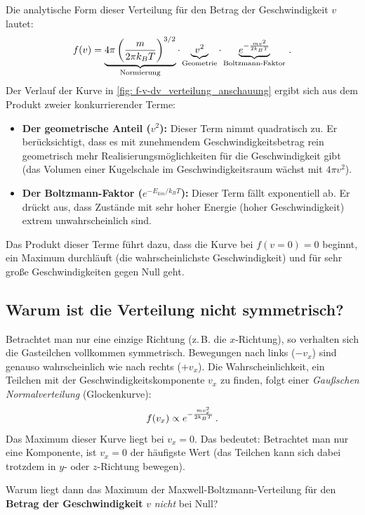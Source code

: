 Die analytische Form dieser Verteilung für den Betrag der Geschwindigkeit $v$ lautet:
\begin{equation}\label{eq:maxwell_boltzmann}
    f(v) = \underbrace{4\pi \left(\frac{m}{2\pi k_B T}\right)^{3/2}}_{\text{Normierung}} \cdot \underbrace{v^2}_{\text{Geometrie}} \cdot \underbrace{e^{-\frac{mv^2}{2k_B T}}}_{\text{Boltzmann-Faktor}} \,.
\end{equation}
Der Verlauf der Kurve in \cref{fig: f-v-dv_verteilung_anschauung} ergibt sich aus dem Produkt zweier konkurrierender Terme:
\begin{itemize}
    \item \textbf{Der geometrische Anteil ($v^2$):} Dieser Term nimmt quadratisch zu. Er berücksichtigt, dass es mit zunehmendem Geschwindigkeitsbetrag rein geometrisch mehr Realisierungsmöglichkeiten für die Geschwindigkeit gibt (das Volumen einer Kugelschale im Geschwindigkeitsraum wächst mit $4\pi v^2$).
    \item \textbf{Der Boltzmann-Faktor ($e^{-E_{kin}/k_B T}$):} Dieser Term fällt exponentiell ab. Er drückt aus, dass Zustände mit sehr hoher Energie (hoher Geschwindigkeit) extrem unwahrscheinlich sind.
\end{itemize}
Das Produkt dieser Terme führt dazu, dass die Kurve bei $f(v=0) = 0$ beginnt, ein Maximum durchläuft (die wahrscheinlichste Geschwindigkeit) und für sehr große Geschwindigkeiten gegen Null geht.
\subsection{Warum ist die Verteilung nicht symmetrisch?}
Betrachtet man nur eine einzige Richtung (z.\,B. die $x$-Richtung), so verhalten sich die Gasteilchen vollkommen symmetrisch. Bewegungen nach links ($-v_x$) sind genauso wahrscheinlich wie nach rechts ($+v_x$). Die Wahrscheinlichkeit, ein Teilchen mit der Geschwindigkeitskomponente $v_x$ zu finden, folgt einer \textit{Gaußschen Normalverteilung} (Glockenkurve):
\begin{equation}
    f(v_x) \propto e^{-\frac{m v_x^2}{2 k_B T}} \,.
\end{equation}
Das Maximum dieser Kurve liegt bei $v_x = 0$. Das bedeutet: Betrachtet man nur eine Komponente, ist $v_x = 0$ der häufigste Wert (das Teilchen kann sich dabei trotzdem in $y$- oder $z$-Richtung bewegen).

Warum liegt dann das Maximum der Maxwell-Boltzmann-Verteilung für den \textbf{Betrag der Geschwindigkeit} $v$ \textit{nicht} bei Null?

